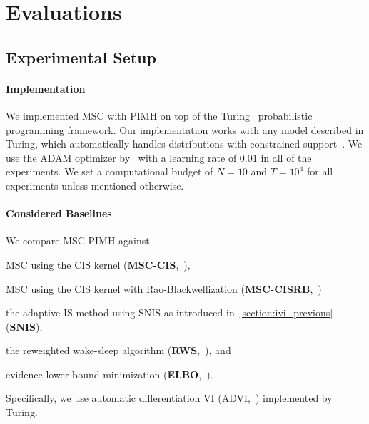 

\vspace{-0.05in}
\section{Evaluations}\label{section:eval}
\subsection{Experimental Setup}
\paragraph{Implementation}
We implemented MSC with PIMH on top of the Turing~\citep{ge2018t} probabilistic programming framework.
Our implementation works with any model described in Turing, which automatically handles distributions with constrained support~\citep{JMLR:v18:16-107}.
We use the ADAM optimizer by~\citet{kingma_adam_2017} with a learning rate of 0.01 in all of the experiments.
We set a computational budget of \(N=10\) and \(T=10^4\) for all experiments unless mentioned otherwise.

\vspace{-0.1in}
\paragraph{Considered Baselines}
We compare MSC-PIMH against
\begin{enumerate*}[label=\textbf{(\roman*)}]
  \item  MSC using the CIS kernel (\textbf{MSC-CIS},~\citealt{NEURIPS2020_b2070693}), 
  \item  MSC using the CIS kernel with Rao-Blackwellization (\textbf{MSC-CISRB},~\citealt{NEURIPS2020_b2070693})
  \item the adaptive IS method using SNIS as introduced in~\cref{section:ivi_previous} (\textbf{SNIS}),
  \item the reweighted wake-sleep algorithm (\textbf{RWS},~\citealt{DBLP:journals/corr/BornscheinB14}), and  
  \item evidence lower-bound minimization (\textbf{ELBO},~\citealt{pmlr-v33-ranganath14}).
\end{enumerate*}
Specifically, we use automatic differentiation VI (ADVI,~\citealt{JMLR:v18:16-107}) implemented by Turing.

